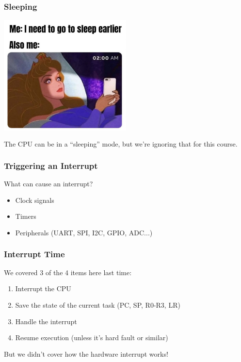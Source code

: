 \begin{frame}
\frametitle{Sleeping}

\begin{center}
	\includegraphics[width=0.5\textwidth]{images/awakebeauty.jpg}
\end{center}

The CPU can be in a ``sleeping'' mode, but we're ignoring that for this course.

\end{frame}

\begin{frame}
\frametitle{Triggering an Interrupt}

What can cause an interrupt?

\begin{itemize}
	\item Clock signals
	\item Timers
	\item Peripherals (UART, SPI, I2C, GPIO, ADC...)
\end{itemize}

\end{frame}

\begin{frame}
\frametitle{Interrupt Time}

We covered 3 of the 4 items here last time:

\begin{enumerate}
	\item Interrupt the CPU
	\item Save the state of the current task (PC, SP, R0-R3, LR)
	\item Handle the interrupt
	\item Resume execution (unless it's hard fault or similar)
\end{enumerate}

But we didn't cover how the hardware interrupt works!


\end{frame}

